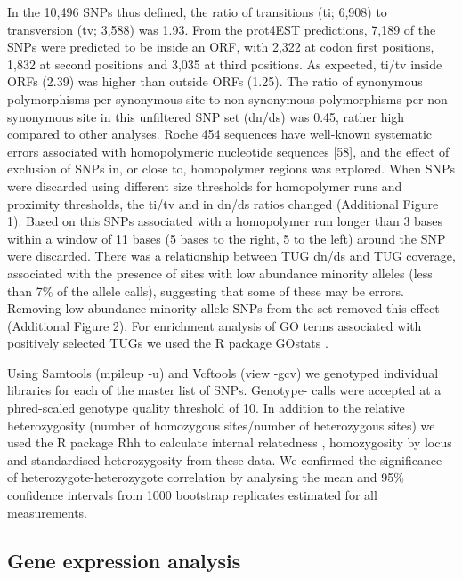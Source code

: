 \documentclass[10pt]{bmc_article}
\newenvironment{bmcformat}{\begin{raggedright}\baselineskip20pt\sloppy\setboolean{publ}{false}}{\end{raggedright}\baselineskip20pt\sloppy}
\begin{document}
\begin{bmcformat}
In the 10,496 SNPs thus defined, the ratio of transitions (ti; 6,908)
to transversion (tv; 3,588) was 1.93. From the prot4EST predictions,
7,189 of the SNPs were predicted to be inside an ORF, with 2,322 at
codon first positions, 1,832 at second positions and 3,035 at third
positions. As expected, ti/tv inside ORFs (2.39) was higher than
outside ORFs (1.25). The ratio of synonymous polymorphisms per
synonymous site to non-synonymous polymorphisms per non-synonymous
site in this unfiltered SNP set (dn/ds) was 0.45, rather high compared
to other analyses. Roche 454 sequences have well-known systematic
errors associated with homopolymeric nucleotide sequences [58], and
the effect of exclusion of SNPs in, or close to, homopolymer regions
was explored. When SNPs were discarded using different size thresholds
for homopolymer runs and proximity thresholds, the ti/tv and in dn/ds
ratios changed (Additional Figure 1). Based on this SNPs associated
with a homopolymer run longer than 3 bases within a window of 11 bases
(5 bases to the right, 5 to the left) around the SNP were
discarded. There was a relationship between TUG dn/ds and TUG
coverage, associated with the presence of sites with low abundance
minority alleles (less than 7\% of the allele calls), suggesting that
some of these may be errors. Removing low abundance minority allele
SNPs from the set removed this effect (Additional Figure 2). For
enrichment analysis of GO terms associated with positively selected
TUGs we used the R package GOstats \cite{pmid17098774}.

Using Samtools \cite{journals/bioinformatics/LiHWFRHMAD09} (mpileup
-u) and Vcftools \cite{pmid21653522} (view -gcv) we genotyped
individual libraries for each of the master list of SNPs. Genotype-
calls were accepted at a phred-scaled genotype quality threshold of
10. In addition to the relative heterozygosity (number of homozygous
sites/number of heterozygous sites) we used the R package Rhh
\cite{pmid21565077} to calculate internal relatedness
\cite{pmid11571049}, homozygosity by locus \cite{pmid17107491} and
standardised heterozygosity \cite{coltman81j} from these data. We
confirmed the significance of heterozygote-heterozygote correlation by
analysing the mean and 95\% confidence intervals from 1000 bootstrap
replicates estimated for all measurements.

\subsection*{Gene expression analysis}


\end{bmcformat}
\end{document}
